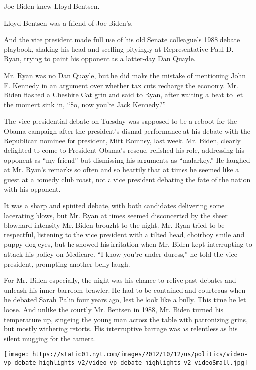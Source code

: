 Joe Biden knew Lloyd Bentsen.

Lloyd Bentsen was a friend of Joe Biden's.

And the vice president made full use of his old Senate colleague's 1988
debate playbook, shaking his head and scoffing pityingly at
Representative Paul D. Ryan, trying to paint his opponent as a
latter-day Dan Quayle.

Mr. Ryan was no Dan Quayle, but he did make the mistake of mentioning
John F. Kennedy in an argument over whether tax cuts recharge the
economy. Mr. Biden flashed a Cheshire Cat grin and said to Ryan, after
waiting a beat to let the moment sink in, ``So, now you're Jack
Kennedy?''

The vice presidential debate on Tuesday was supposed to be a reboot for
the Obama campaign after the president's dismal performance at his
debate with the Republican nominee for president, Mitt Romney, last
week. Mr. Biden, clearly delighted to come to President Obama's rescue,
relished his role, addressing his opponent as ``my friend'' but
dismissing his arguments as ``malarkey.'' He laughed at Mr. Ryan's
remarks so often and so heartily that at times he seemed like a guest at
a comedy club roast, not a vice president debating the fate of the
nation with his opponent.

It was a sharp and spirited debate, with both candidates delivering some
lacerating blows, but Mr. Ryan at times seemed disconcerted by the sheer
blowhard intensity Mr. Biden brought to the night. Mr. Ryan tried to be
respectful, listening to the vice president with a tilted head, choirboy
smile and puppy-dog eyes, but he showed his irritation when Mr. Biden
kept interrupting to attack his policy on Medicare. ``I know you're
under duress,'' he told the vice president, prompting another belly
laugh.

For Mr. Biden especially, the night was his chance to relive past
debates and unleash his inner barroom brawler. He had to be contained
and courteous when he debated Sarah Palin four years ago, lest he look
like a bully. This time he let loose. And unlike the courtly Mr. Bentsen
in 1988, Mr. Biden turned his temperature up, singeing the young man
across the table with patronizing grins, but mostly withering retorts.
His interruptive barrage was as relentless as his silent mugging for the
camera.

\texttt{[image: https://static01.nyt.com/images/2012/10/12/us/politics/video-vp-debate-highlights-v2/video-vp-debate-highlights-v2-videoSmall.jpg]}

